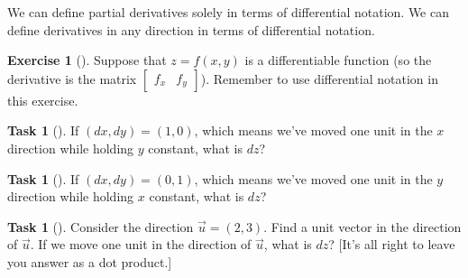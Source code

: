 \documentclass[10pt,]{book}
\theoremstyle{plain}
\theoremstyle{definition}
\theoremstyle{definition}
\theoremstyle{definition}
\theoremstyle{definition}
\newtheorem{exploration}[project]{Exercise}
\newtheorem{task}[project]{Task}
\theoremstyle{definition}
\numberwithin{equation}{section}
\newcommand{\amp}{&}
\begin{document}
We can define partial derivatives solely in terms of differential notation. We can define derivatives in any direction in terms of differential notation.%
\begin{exploration}[]\label{exploration-227}
Suppose that \(z=f(x,y)\) is a differentiable function (so the derivative is the matrix \(\begin{bmatrix}f_x\amp f_y
\end{bmatrix}\)). Remember to use differential notation in this exercise.%
\begin{task}[]\label{task-602}
If \((dx,dy)=(1,0)\), which means we've moved one unit in the \(x\) direction while holding \(y\) constant, what is \(dz\)?%
\end{task}
\begin{task}[]\label{task-603}
If \((dx,dy)=(0,1)\), which means we've moved one unit in the \(y\) direction while holding \(x\) constant, what is \(dz\)?%
\end{task}
\begin{task}[]\label{task-604}
Consider the direction \(\vec u=(2,3)\).  Find a unit vector in the direction of \(\vec u\).  If we move one unit in the direction of \(\vec u\), what is \(dz\)? [It's all right to leave you answer as a dot product.]%
\end{task}
\end{exploration}
\typeout{************************************************}
\typeout{************************************************}
\end{document}
